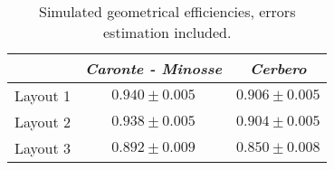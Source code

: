 \begin{table}[!hbp]
	\centering
	\begin{tabular}{r|cc}
		\toprule
		&\emph{Caronte - Minosse} & \emph{Cerbero}\\
		\midrule
		Layout 1  & $0.940\pm 0.005$ & $0.906\pm 0.005$\\
		Layout 2 & $0.938\pm 0.005$ & $0.904\pm 0.005$\\ 
		Layout 3 & $0.892\pm 0.009$ & $0.850\pm 0.008$\\
		\bottomrule
	\end{tabular}
	\caption{Simulated geometrical efficiencies, errors estimation included.}\label{tab:err-effg}
\end{table}

